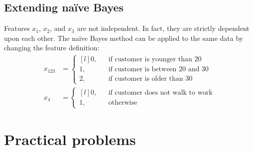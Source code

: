 \documentclass[a4paper,11pt]{article}
\begin{document}
\subsection{Extending na\"ive Bayes}
Features $x_1$, $x_2$, and $x_3$ are not independent. In fact, they are strictly dependent upon each other. The na\"ive Bayes method can be applied to the same data by changing the feature definition:
\begin{align*}
  x_{123} &= \left\{
    \begin{matrix*}[l]
      0, & & \textrm{if customer is younger than 20}\\
      1, & & \textrm{if customer is between 20 and 30}\\
      2, & & \textrm{if customer is older than 30}
    \end{matrix*}
  \right.\\
  x_4 &= \left\{
    \begin{matrix*}[l]
      0, & & \textrm{if customer does not walk to work}\\
      1, & & \textrm{otherwise}
    \end{matrix*}
  \right.
\end{align*}
\section{Practical problems}
\subsection{}

\subsection{}
\end{document}
